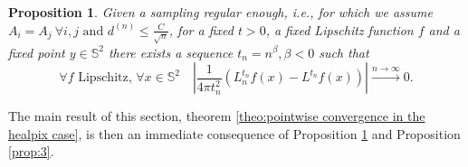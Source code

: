 \documentclass{article} %
\newtheorem{prop}{Proposition}
\begin{document}
\vspace{0.5cm}
\begin{prop}\label{prop:2}
	Given a sampling regular enough, i.e., for which we assume $A_i=A_j \ \forall i,j\text{ and }d^{(n)}\leq \frac{C}{\sqrt{n}}$, for a fixed $t>0$, a fixed Lipschitz function $f$ and a fixed point $y\in\mathbb S^2$ there exists a sequence $t_n = n^\beta, \beta<0$ such that
$$
\forall f \text{ Lipschitz, } \forall x\in\mathbb S^2 \quad \left|\frac{1}{4\pi t_n^2}\left(L_n^{t_n}f(x) - L^{t_n}f(x)\right)\right|\xrightarrow{n\to \infty}0.
$$
\end{prop}
\vspace{0.5cm}

The main result of this section, theorem  \ref{theo:pointwise convergence in the healpix case}, is then an immediate consequence of Proposition \ref{prop:2} and Proposition \ref{prop:3}.
\end{document}
